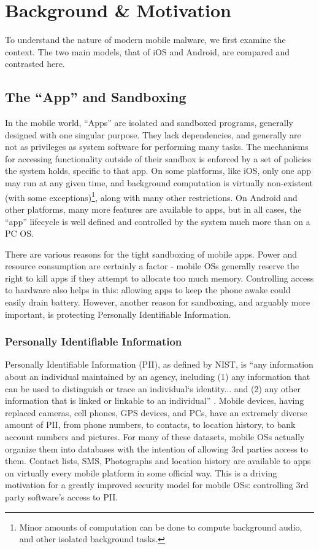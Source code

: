 \chapter{Background \& Motivation}
\label{sec:background}

To understand the nature of modern mobile malware, we first examine the context. The two main models, that of iOS and Android, are compared and contrasted here.

\section{The ``App'' and Sandboxing}

In the mobile world, ``Apps'' are isolated and sandboxed programs, generally designed with one singular purpose. They lack dependencies, and generally are not as privileges as system software for performing many tasks. The mechanisms for accessing functionality outside of their sandbox is enforced by a set of policies the system holds, specific to that app. On some platforms, like iOS, only one app may run at any given time, and background computation is virtually non-existent (with some exceptions)\footnote{Minor amounts of computation can be done to compute background audio, and other isolated background tasks.}, along with many other restrictions. On Android and other platforms, many more features are available to apps, but in all cases, the ``app'' lifecycle is well defined and controlled by the system much more than on a PC OS.

There are various reasons for the tight sandboxing of mobile apps. Power and resource consumption are certainly a factor - mobile OSs generally reserve the right to kill apps if they attempt to allocate too much memory. Controlling access to hardware also helps in this: allowing apps to keep the phone awake could easily drain battery. However, another reason for sandboxing, and arguably more important, is protecting Personally Identifiable Information.

\subsection{Personally Identifiable Information}

Personally Identifiable Information (PII), as defined by NIST, is ``any information about an individual maintained by an agency, including (1) any information that can be used to distinguish or trace an individual‘s identity... and (2) any other information that is linked or linkable to an individual'' \citep{mccallister2010guide}. Mobile devices, having replaced cameras, cell phones, GPS devices, and PCs, have an extremely diverse amount of PII, from phone numbers, to contacts, to location history, to bank account numbers and pictures. For many of these datasets, mobile OSs actually organize them into databases with the intention of allowing 3rd parties access to them. Contact lists, SMS, Photographs and location history are available to apps on virtually every mobile platform in some official way. This is a driving motivation for a greatly improved security model for mobile OSs: controlling 3rd party software's access to PII. 

